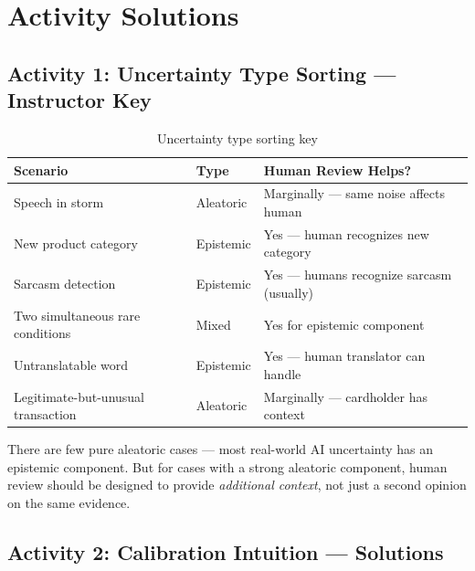 \section{Activity Solutions}

\subsection{Activity 1: Uncertainty Type Sorting --- Instructor Key}

\begin{table}[htbp]
\caption{Uncertainty type sorting key}
\label{tab:sorting-key}
\centering
\begin{tabular}{@{}p{4.5cm}p{2.5cm}p{4.5cm}@{}}
\toprule
\textbf{Scenario} & \textbf{Type} & \textbf{Human Review Helps?} \\
\midrule
Speech in storm & Aleatoric & Marginally --- same noise affects human \\
New product category & Epistemic & Yes --- human recognizes new category \\
Sarcasm detection & Epistemic & Yes --- humans recognize sarcasm (usually) \\
Two simultaneous rare conditions & Mixed & Yes for epistemic component \\
Untranslatable word & Epistemic & Yes --- human translator can handle \\
Legitimate-but-unusual transaction & Aleatoric & Marginally --- cardholder has context \\
\bottomrule
\end{tabular}
\end{table}

\begin{keyconcept}
There are few pure aleatoric cases --- most real-world AI uncertainty has an epistemic component. But for cases with a strong aleatoric component, human review should be designed to provide \emph{additional context}, not just a second opinion on the same evidence.
\end{keyconcept}

\subsection{Activity 2: Calibration Intuition --- Solutions}

